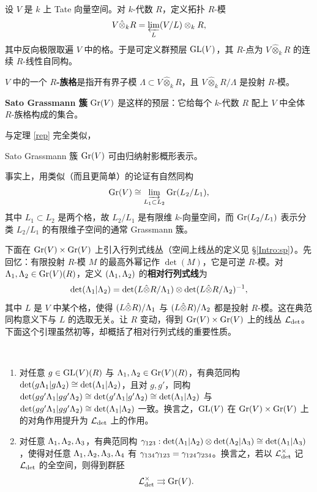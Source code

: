 设 $V$ 是 $k$ 上 Tate 向量空间。对 $k$-代数 $R$，定义拓扑 $R$-模
\[V\hat\otimes_k R= \varprojlim_L (V/L)\otimes_kR,\]
其中反向极限取遍 $V$ 中的格。于是可定义群预层 ${\operatorname{GL}}(V)$，其 $R$-点为 $V\hat\otimes_k R$ 的连续 $R$-线性自同构。

\begin{dfn}
$V$ 中的一个 \textbf{$R$-族格}是指开有界子模 $\Lambda\subset V\hat\otimes_k R$，且 $V\hat\otimes_k R/\Lambda$ 是投射 $R$-模。
\end{dfn}

\begin{dfn}
\textbf{Sato Grassmann 簇} ${\operatorname{Gr}}(V)$ 是这样的预层：它给每个 $k$-代数 $R$ 配上 $V$ 中全体 $R$-族格构成的集合。
\end{dfn}

与定理 \ref{rep} 完全类似，
\begin{thm}
Sato Grassmann 簇 ${\operatorname{Gr}}(V)$ 可由归纳射影概形表示。
\end{thm}
事实上，用类似（而且更简单）的论证有自然同构
\[{\operatorname{Gr}}(V)\cong \varinjlim_{L_1\subset L_2}{\operatorname{Gr}}(L_2/L_1),\]
其中 $L_1\subset L_2$ 是两个格，故 $L_2/L_1$ 是有限维 $k$-向量空间，而 ${\operatorname{Gr}}(L_2/L_1)$ 表示分类 $L_2/L_1$ 的有限维子空间的通常 Grassmann 簇。

下面在 ${\operatorname{Gr}}(V)\times {\operatorname{Gr}}(V)$ 上引入行列式线丛（空间上线丛的定义见 \S\ref{Intro:sp}）。先回忆：有限投射 $R$-模 $M$ 的最高外幂记作 $\det(M)$，它是可逆 $R$-模。对 $\Lambda_1,{\Lambda}_2\in{\operatorname{Gr}}(V)(R)$，定义 $({\Lambda}_1,{\Lambda}_2)$ 的\textbf{相对行列式线}为
\[\det({\Lambda}_1|{\Lambda}_2)=\det(L\hat\otimes R/{\Lambda}_1)\otimes \det(L\hat\otimes R/{\Lambda}_2)^{-1},\]
其中 $L$ 是 $V$ 中某个格，使得 $(L\hat\otimes R)/{\Lambda}_1$ 与 $(L\hat\otimes R)/{\Lambda}_2$ 都是投射 $R$-模。这在典范同构意义下与 $L$ 的选取无关。让 $R$ 变动，得到 ${\operatorname{Gr}}(V)\times{\operatorname{Gr}}(V)$ 上的线丛 ${\mathcal L}_{\det}$。下面这个引理虽然初等，却概括了相对行列式线的重要性质。

\begin{lem}~
\begin{enumerate}
\item 对任意 $g\in  {\operatorname{GL}}(V)(R)$ 与 ${\Lambda}_1,{\Lambda}_2\in{\operatorname{Gr}}(V)(R)$，有典范同构 $\det(g{\Lambda}_1|g{\Lambda}_2)\cong\det({\Lambda}_1|{\Lambda}_2)$，且对 $g,g'$，同构 $\det(gg'{\Lambda}_1|gg'{\Lambda}_2)\cong\det(g'{\Lambda}_1|g'{\Lambda}_2)\cong\det({\Lambda}_1|{\Lambda}_2)$ 与 $\det(gg'{\Lambda}_1|gg'{\Lambda}_2)\cong\det({\Lambda}_1|{\Lambda}_2)$ 一致。换言之，${\operatorname{GL}}(V)$ 在 ${\operatorname{Gr}}(V)\times{\operatorname{Gr}}(V)$ 上的对角作用提升为 ${\mathcal L}_{\det}$ 上的作用。
\item 对任意 ${\Lambda}_1,{\Lambda}_2,{\Lambda}_3$，有典范同构 ${\gamma}_{123}:\det({\Lambda}_1|{\Lambda}_2)\otimes\det({\Lambda}_2|{\Lambda}_3)\cong\det({\Lambda}_1|{\Lambda}_3)$，使得对任意 ${\Lambda}_1,{\Lambda}_2,{\Lambda}_3,{\Lambda}_4$ 有 ${\gamma}_{134}{\gamma}_{123}={\gamma}_{124}{\gamma}_{234}$。换言之，若以 ${\mathcal L}_{\det}^\times$ 记 ${\mathcal L}_{\det}$ 的全空间，则得到群胚
\[{\mathcal L}_{\det}^\times\rightrightarrows{\operatorname{Gr}}(V).\]
\end{enumerate}
\end{lem}

